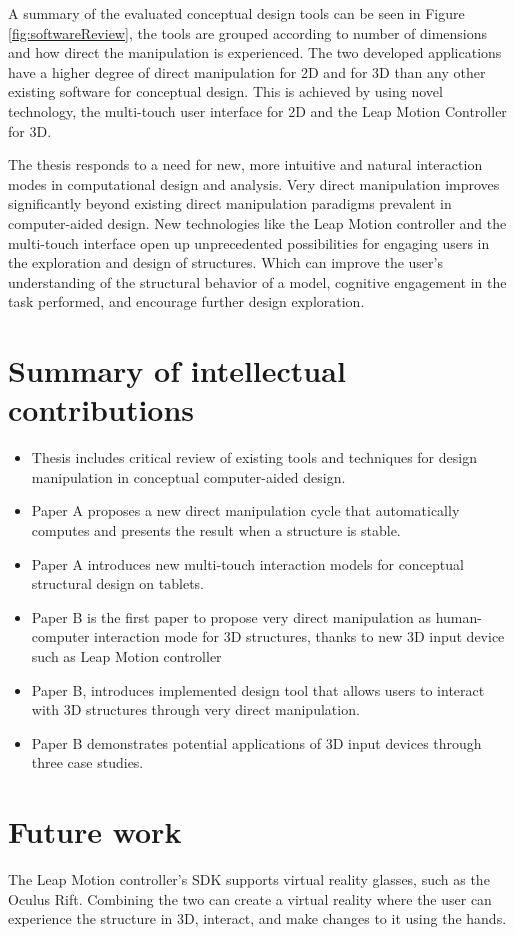 A summary of the evaluated conceptual design tools can be seen in Figure \ref{fig:softwareReview}, the tools are grouped according to number of dimensions and how direct the manipulation is experienced. The two developed applications have a higher degree of direct manipulation for 2D and for 3D than any other existing software for conceptual design. This is achieved by using novel technology, the multi-touch user interface for 2D and the Leap Motion Controller for 3D.

The thesis responds to a need for new, more intuitive and natural interaction modes in computational design and analysis. Very direct manipulation improves significantly beyond existing direct manipulation paradigms prevalent in computer-aided design. New technologies like the Leap Motion controller and the multi-touch interface open up unprecedented possibilities for engaging users in the exploration and design of structures. Which can improve the user’s understanding of the structural behavior of a model, cognitive engagement in the task performed, and encourage further design exploration.


\section{Summary of intellectual contributions}
\begin{itemize} 
\item Thesis includes critical review of existing tools and techniques for design manipulation in conceptual computer-aided design.
\item Paper A proposes a new direct manipulation cycle that automatically computes and presents the result when a structure is stable.
\item Paper A introduces new multi-touch interaction models for conceptual structural design on tablets.
\item Paper B is the first paper to propose very direct manipulation as human-computer interaction mode for 3D structures, thanks to new 3D input device such as Leap Motion controller
\item Paper B, introduces implemented design tool that allows users to interact with 3D structures through very direct manipulation.
\item Paper B demonstrates potential applications of 3D input devices through three case studies.
\end{itemize} 


\section{Future work}
The Leap Motion controller’s SDK supports virtual reality glasses, such as the Oculus Rift. Combining the two can create a virtual reality where the user can experience the structure in 3D, interact, and make changes to it using the hands. 

